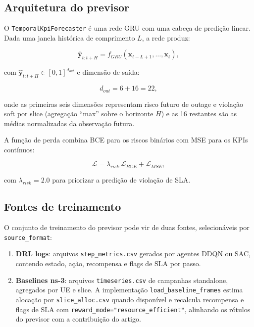 \documentclass[10pt,a4paper]{IEEEtran}
\begin{document}
\subsection{Arquitetura do previsor}

O \texttt{TemporalKpiForecaster} \'{e} uma rede GRU com uma
cabe\c{c}a de predi\c{c}\~{a}o linear. Dada uma janela
hist\'{o}rica de comprimento $L$, a rede produz:

\begin{equation}
\hat{\mathbf{y}}_{t:t+H} = f_{\textit{GRU}}(\mathbf{x}_{t-L+1}, \dots, \mathbf{x}_t),
\label{eq:gru_forward}
\end{equation}

com $\hat{\mathbf{y}}_{t:t+H} \in [0,1]^{d_{\textit{out}}}$
e dimens\~{a}o de sa\'{i}da:

\begin{equation}
d_{\textit{out}} = 6 + 16 = 22,
\label{eq:output_dim}
\end{equation}

onde as primeiras seis dimens\~{o}es representam risco futuro
de outage e viola\c{c}\~{a}o soft por slice (agrega\c{c}\~{a}o
``max'' sobre o horizonte $H$) e as 16 restantes s\~{a}o as
m\'{e}dias normalizadas da observa\c{c}\~{a}o futura.

A fun\c{c}\~{a}o de perda combina BCE para os riscos
bin\'{a}rios com MSE para os KPIs cont\'{i}nuos:

\begin{equation}
\mathcal{L} = \lambda_{\textit{risk}}\,\mathcal{L}_{\textit{BCE}}
              + \mathcal{L}_{\textit{MSE}},
\label{eq:forecaster_loss}
\end{equation}

com $\lambda_{\textit{risk}} = 2.0$ para priorizar a
predi\c{c}\~{a}o de viola\c{c}\~{a}o de SLA.

\subsection{Fontes de treinamento}

O conjunto de treinamento do previsor pode vir de duas fontes,
selecion\'{a}veis por \texttt{source\_format}:

\begin{enumerate}
\item \textbf{DRL logs}: arquivos \texttt{step\_metrics.csv}
  gerados por agentes DDQN ou SAC, contendo estado,
  a\c{c}\~{a}o, recompensa e flags de SLA por passo.
\item \textbf{Baselines ns-3}: arquivos
  \texttt{timeseries.csv} de campanhas standalone,
  agregados por UE e slice. A implementa\c{c}\~{a}o
  \texttt{load\_baseline\_frames} estima aloca\c{c}\~{a}o
  por \texttt{slice\_alloc.csv} quando dispon\'{i}vel e
  recalcula recompensa e flags de SLA com
  \texttt{reward\_mode="resource\_efficient"}, alinhando os
  r\'{o}tulos do previsor com a contribui\c{c}\~{a}o do artigo.
\end{enumerate}
\end{document}

